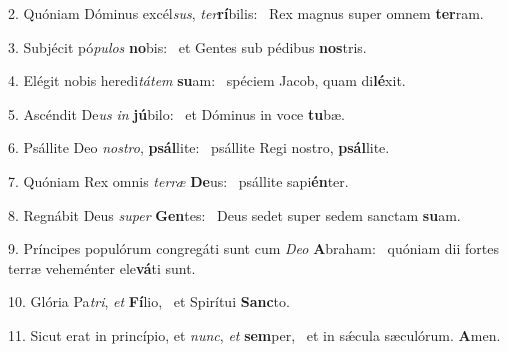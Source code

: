 2. Quóniam Dóminus excél\textit{sus}, \textit{ter}\textbf{rí}bilis: \ast\  Rex magnus super omnem \textbf{ter}ram.\

3. Subjécit pó\textit{pu}\textit{los} \textbf{no}bis: \ast\  et Gentes sub pédibus \textbf{nos}tris.\

4. Elégit nobis heredi\textit{tá}\textit{tem} \textbf{su}am: \ast\  spéciem Jacob, quam di\textbf{lé}xit.\

5. Ascéndit De\textit{us} \textit{in} \textbf{jú}bilo: \ast\  et Dóminus in voce \textbf{tu}bæ.\

6. Psállite Deo \textit{nos}\textit{tro}, \textbf{psál}lite: \ast\  psállite Regi nostro, \textbf{psál}lite.\

7. Quóniam Rex omnis \textit{ter}\textit{ræ} \textbf{De}us: \ast\  psállite sapi\textbf{én}ter.\

8. Regnábit Deus \textit{su}\textit{per} \textbf{Gen}tes: \ast\  Deus sedet super sedem sanctam \textbf{su}am.\

9. Príncipes populórum congregáti sunt cum \textit{De}\textit{o} \textbf{A}braham: \ast\  quóniam dii fortes terræ veheménter ele\textbf{vá}ti sunt.\

10. Glória Pa\textit{tri}, \textit{et} \textbf{Fí}lio, \ast\  et Spirítui \textbf{Sanc}to.\

11. Sicut erat in princípio, et \textit{nunc}, \textit{et} \textbf{sem}per, \ast\  et in sǽcula sæculórum. \textbf{A}men.\

